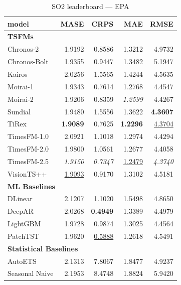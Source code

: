 \begin{table}[H]
\caption{SO2 leaderboard --- EPA}
\centering
\begin{small}
\begin{tabular}{lrrrr}
\toprule
model & MASE & CRPS & MAE & RMSE \\
\midrule
\multicolumn{5}{l}{\textbf{TSFMs}} \\
Chronos-2 & 1.9192 & 0.8586 & 1.3212 & 4.9732 \\
Chronos-Bolt & 1.9355 & 0.9447 & 1.3482 & 5.1947 \\
Kairos & 2.0256 & 1.5565 & 1.4244 & 4.5635 \\
Moirai-1 & 1.9343 & 0.7614 & 1.2768 & 4.4547 \\
Moirai-2 & 1.9206 & 0.8359 & \textit{1.2599} & 4.4267 \\
Sundial & 1.9480 & 1.5556 & 1.3622 & \textbf{4.3607} \\
TiRex & \textbf{1.9089} & 0.7625 & \textbf{1.2296} & \underline{4.3704} \\
TimesFM-1.0 & 2.0921 & 1.1018 & 1.2974 & 4.4294 \\
TimesFM-2.0 & 1.9800 & 1.0561 & 1.2677 & 4.4058 \\
TimesFM-2.5 & \textit{1.9150} & \textit{0.7347} & \underline{1.2479} & \textit{4.3740} \\
VisionTS++ & \underline{1.9093} & 0.9170 & 1.3102 & 4.5181 \\
\midrule
\multicolumn{5}{l}{\textbf{ML Baselines}} \\
DLinear & 2.1207 & 1.1020 & 1.5498 & 4.8650 \\
DeepAR & 2.0268 & \textbf{0.4949} & 1.3389 & 4.4979 \\
LightGBM & 1.9728 & 0.9874 & 1.3025 & 4.4564 \\
PatchTST & 1.9620 & \underline{0.5888} & 1.2618 & 4.5491 \\
\midrule
\multicolumn{5}{l}{\textbf{Statistical Baselines}} \\
AutoETS & 2.1313 & 7.8067 & 1.8477 & 4.9237 \\
Seasonal Naive & 2.1953 & 8.4748 & 1.8824 & 5.9420 \\
\bottomrule
\end{tabular}
\end{small}
\end{table}